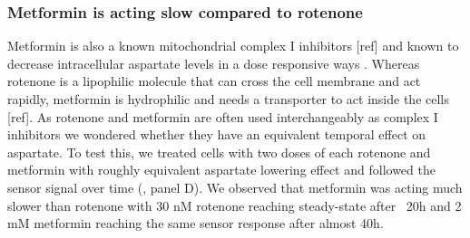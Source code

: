 \documentclass[9pt,lineno]{elife}
\begin{document}
\subsubsection{Metformin is acting slow compared to rotenone}
Metformin is also a known mitochondrial complex I inhibitors [ref] and known to decrease intracellular aspartate levels in a dose responsive ways \citep{Gui2016-ca}.
Whereas rotenone is a lipophilic molecule that can cross the cell membrane and act rapidly, metformin is hydrophilic and needs a transporter to act inside the cells [ref].
As rotenone and metformin are often used interchangeably as complex I inhibitors we wondered whether they have an equivalent temporal effect on aspartate.
To test this, we treated cells with two doses of each rotenone and metformin with roughly equivalent aspartate lowering effect and followed the sensor signal over time (, panel D).
We observed that metformin was acting much slower than rotenone with 30 nM rotenone reaching steady-state after ~20h and 2 mM metformin reaching the same sensor response after almost 40h.
\end{document}
